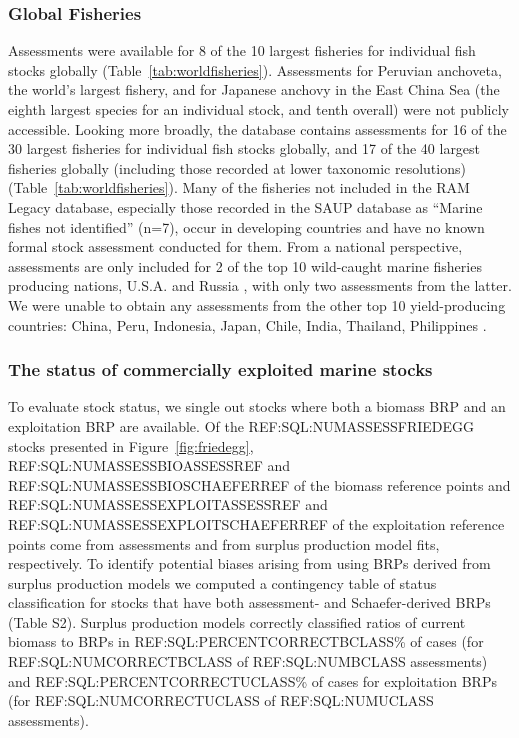 \subsubsection*{Global Fisheries}
Assessments were available for 8 of the 10 largest fisheries for
individual fish stocks globally (Table~\ref{tab:worldfisheries}).
Assessments for Peruvian anchoveta, the world's largest fishery, and
for Japanese anchovy in the East China Sea (the eighth largest species
for an individual stock, and tenth overall) were not publicly
accessible.  Looking more broadly, the database contains assessments
for 16 of the 30 largest fisheries for individual fish stocks
globally, and 17 of the 40 largest fisheries globally (including those
recorded at lower taxonomic resolutions)
(Table~\ref{tab:worldfisheries}). Many of the fisheries not included
in the RAM Legacy database, especially those recorded in the SAUP
database as ``Marine fishes not identified'' (n=7), occur in
developing countries and have no known formal stock assessment
conducted for them.  From a national perspective, assessments are only
included for 2 of the top 10 wild-caught marine fisheries producing
nations, U.S.A. and Russia \citep{FAO:sofia}, with only two
assessments from the latter. We were unable to obtain any assessments
from the other top 10 yield-producing countries: China, Peru,
Indonesia, Japan, Chile, India, Thailand, Philippines
\citep{FAO:sofia}.



\subsubsection*{The status of commercially exploited marine stocks }
To evaluate stock status, we single out stocks where both a biomass
BRP and an exploitation BRP are available. Of the
REF:SQL:NUMASSESSFRIEDEGG stocks presented in
Figure~\ref{fig:friedegg}, REF:SQL:NUMASSESSBIOASSESSREF and
REF:SQL:NUMASSESSBIOSCHAEFERREF of the biomass reference points and
REF:SQL:NUMASSESSEXPLOITASSESSREF and
REF:SQL:NUMASSESSEXPLOITSCHAEFERREF of the exploitation reference
points come from assessments and from surplus production model fits,
respectively.  To identify potential biases arising from using BRPs
derived from surplus production models we computed a contingency table
of status classification for stocks that have both assessment- and
Schaefer-derived BRPs (Table S2). Surplus production models correctly
classified ratios of current biomass to BRPs in
REF:SQL:PERCENTCORRECTBCLASS\% of cases (for REF:SQL:NUMCORRECTBCLASS
of REF:SQL:NUMBCLASS assessments) and REF:SQL:PERCENTCORRECTUCLASS\%
of cases for exploitation BRPs (for REF:SQL:NUMCORRECTUCLASS of
REF:SQL:NUMUCLASS assessments).

